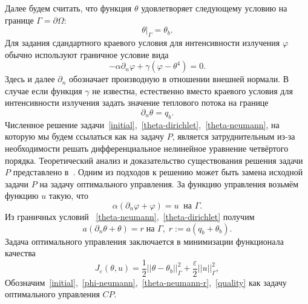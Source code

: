 \documentclass[10pt]{article}
\begin{document}
    Далее будем считать, что функция $\theta$ удовлетворяет следующему условию на границе
    $\Gamma = \partial \Omega$:
    \begin{equation}
        \label{theta-dirichlet}
        \theta|_\Gamma = \theta_b.
    \end{equation}
    Для задания сдандартного краевого условия для интенсивности излучения $\varphi$ обычно
    используют граничное условие вида
    \begin{equation}
        \label{phi-default}
        - \alpha \partial_n \varphi + \gamma (\varphi - \theta ^4) = 0.
    \end{equation}
    Здесь и далее $\partial_n$ обозначает производную в отношении внешней нормали.
    В случае если функция $\gamma$ не известна, естественно вместо краевого условия для
    интенсивности излучения задать значение теплового потока на границе
    \begin{equation}
        \label{theta-neumann}
        \partial_n \theta = q_b.
    \end{equation}
    Численное решение
    задачи~\eqref{initial},~\eqref{theta-dirichlet},~\eqref{theta-neumann},
    на которую мы будем ссылаться как на задачу $P$, является затруднительным из-за необходимости
    решать дифференциальное нелинейное уравнение четвёртого порядка.
    Теоретический анализ и доказательство существования решения задачи $P$ представлено
    в~\cite{cheb-same}.
    Одним из подходов к решению может быть замена исходной задачи $P$ на задачу
    оптимального управления.
    За функцию управления возьмём функцию $u$ такую, что
    \begin{equation}
        \label{phi-boundary}
        \alpha (\partial_n \varphi + \varphi) = u \;\; \text{на } \Gamma.
    \end{equation}
    Из граничных условий ~\eqref{theta-neumann},~\eqref{theta-dirichlet} получим
    \begin{equation}
        \label{theta-boundary}
        a (\partial_n \theta  + \theta)  = r \; \text{на } \Gamma, \; r := a \left(q_b + \theta_b\right).
    \end{equation}
    Задача оптимального управления заключается в минимизации функционала качества
    \begin{equation}
        \label{quality}
        J_\varepsilon(\theta, u) = \frac{1}{2} ||\theta - \theta_b||^2_\Gamma + \frac{\varepsilon}{2}||u||^2_\Gamma,
    \end{equation}
    Обозначим~\eqref{initial},~\eqref{phi-neumann},~\eqref{theta-neumann-r},~\eqref{quality}
    как задачу оптимального управления $CP$.
\end{document}
